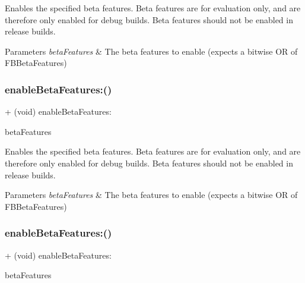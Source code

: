 Enables the specified beta features. Beta features are for evaluation only, and are therefore only enabled for debug builds. Beta features should not be enabled in release builds.


\begin{DoxyParams}{Parameters}
{\em beta\+Features} & The beta features to enable (expects a bitwise OR of F\+B\+Beta\+Features) \\
\hline
\end{DoxyParams}
\mbox{\label{interfaceFBSettings_a9ce6bc977fc54c59ba5cacf56922ccac}} 
\subsubsection{\texorpdfstring{enable\+Beta\+Features\+:()}{enableBetaFeatures:()}\hspace{0.1cm}{\footnotesize\ttfamily [3/5]}}
{\footnotesize\ttfamily + (void) enable\+Beta\+Features\+: \begin{DoxyParamCaption}\item[{(N\+S\+U\+Integer)}]{beta\+Features }\end{DoxyParamCaption}}

Enables the specified beta features. Beta features are for evaluation only, and are therefore only enabled for debug builds. Beta features should not be enabled in release builds.


\begin{DoxyParams}{Parameters}
{\em beta\+Features} & The beta features to enable (expects a bitwise OR of F\+B\+Beta\+Features) \\
\hline
\end{DoxyParams}
\mbox{\label{interfaceFBSettings_a9ce6bc977fc54c59ba5cacf56922ccac}} 
\subsubsection{\texorpdfstring{enable\+Beta\+Features\+:()}{enableBetaFeatures:()}\hspace{0.1cm}{\footnotesize\ttfamily [4/5]}}
{\footnotesize\ttfamily + (void) enable\+Beta\+Features\+: \begin{DoxyParamCaption}\item[{(N\+S\+U\+Integer)}]{beta\+Features }\end{DoxyParamCaption}}

